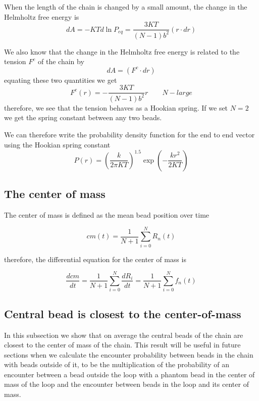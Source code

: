\documentclass{paper}
\begin{document}
When the length of the chain is changed by a small amount, the change in the Helmholtz free energy is 
\begin{equation*}
dA=-KTd\ln{P_{eq}}=\frac{3KT}{(N-1)b^2}(r\cdot dr)
\end{equation*}

We also know that the change in the Helmholtz free energy is related to the tension $F^c$ of the chain by 
\begin{equation*}
dA=(F^c\cdot dr)
\end{equation*}
equating these two quantities we get 
\begin{equation*}
F^c(r) = -\frac{3KT}{(N-1)b^2}r	 \qquad N-large
\end{equation*}
therefore, we see that the tension behaves as a Hookian spring. If we set $N=2$ we get the spring constant between any two beads.

We can therefore write the probability density function for the end to end vector using the Hookian spring constant
\begin{equation*}
P(r)= \left(\frac{k}{2\pi KT}\right)^{1.5}\exp\left(-\frac{k r^2}{2KT}\right)
\end{equation*}

\subsection{The center of mass}\label{subsection_theCenterOfMass}

The center of mass is defined as the mean bead position over time 

\begin{equation*}
cm(t) = \frac{1}{N+1}\sum_{i=0}^N{R_n(t)}
\end{equation*}

therefore, the differential equation for the center of mass is 

\begin{equation*}
\frac{dcm}{dt}=\frac{1}{N+1}\sum_{i=0}^N{\frac{dR_i}{dt}}= \frac{1}{N+1}\sum_{i=0}^Nf_n(t)
\end{equation*}

\subsection{Central bead is closest to the center-of-mass}\label{subsection_centralbeadClosestToCenterOfMass}
In this subsection we show that on average the central beads of the chain are closest to the center of mass of the chain. This result will be useful in future sections when we calculate the encounter probability between beads in the chain with beads outside of it, to be the multiplication of the probability of an encounter between a bead outside the loop with a phantom bead in the center of mass of the loop and the encounter between beads in the loop and its center of mass. 
\end{document}
